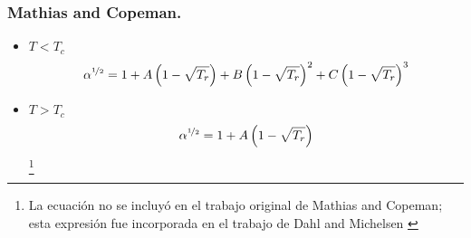 \subsubsection{Mathias and Copeman. \cite{mathiasCopeman,michelsen}}

\begin{itemize}
\item{$T < T_c$}
\begin{equation}
\alpha^{\nicefrac{1}{2}} = 1 + A\left(1-\sqrt{T_r}\right) + B\left(1-\sqrt{T_r}\right)^2 + C\left(1-\sqrt{T_r}\right)^3
\end{equation}
\item{$T > T_c$}
\begin{equation}
\alpha^{\nicefrac{1}{2}} = 1 + A\left(1-\sqrt{T_r}\right)
\end{equation}
\footnote{La ecuación no se incluyó en el trabajo original de Mathias and Copeman\cite{mathiasCopeman}; esta expresión fue incorporada en el trabajo de Dahl and Michelsen \cite{michelsen}}
\end{itemize}